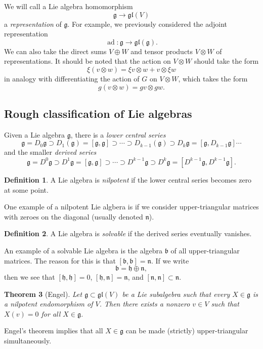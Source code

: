 \documentclass{amsart}
\newtheorem{thm}{Theorem}[section]
\theoremstyle{definition}
\newtheorem{defn}[thm]{Definition}
\theoremstyle{remark}
\theoremstyle{plain}
\theoremstyle{definition}
\theoremstyle{remark}
\newcommand{\g}{\mathfrak{g}}
\newcommand{\h}{\mathfrak{h}}
\newcommand{\n}{\mathfrak{n}}
\renewcommand{\b}{\mathfrak{b}}
\newcommand{\mf}[1]{\mathfrak{#1}}
\newcommand{\1}{\mathbf{1}}
\newcommand{\2}{\mathbf{2}}
\newcommand{\3}{\mathbf{3}}
\newcommand{\gl}{\mf{gl}}
\DeclareMathOperator{\ad}{ad}
\begin{document}
We will call a Lie algebra homomorphism
\[ \g \to \gl(V) \]
a \textit{representation} of \(\g\). For example, we previously considered the adjoint representation
\[ \ad \colon \g \to \gl(\g). \]
We can also take the direct sums \(V \oplus W\) and tensor products \(V \otimes W\) of representations.
It should be noted that the action on \(V \otimes W\) should take the form
\[ \xi (v \otimes w) = \xi v \otimes w + v \otimes \xi w \]
in analogy with differentiating the action of \(G\) on \(V \otimes W\), which takes the form
\[ g(v \otimes w) = gv \otimes gw. \]

\subsection{Rough classification of Lie algebras}%
\label{sub:Rough classification of Lie algebras}

Given a Lie algebra \(\g\), there is a \textit{lower central series}
\[ \g = D_0 \g \supset D_1(\g) = [\g,\g] \supset \cdots \supset D_{k-1}(\g) \supset D_k \g = [\g, D_{k-1} \g] \cdots \]
and the smaller \textit{derived series}
\[ \g = D^0\g \supset D^1 \g = [\g,\g] \supset \cdots \supset D^{k-1} \g \supset D^k \g = [D^{k-1}\g, D^{k-1}\g]. \]

\begin{defn}
    A Lie algebra is \textit{nilpotent} if the lower central series becomes zero at some point.
\end{defn}

One example of a nilpotent Lie algbera is if we consider upper-triangular matrices with zeroes on the diagonal (usually denoted \(\n\)).

\begin{defn}
    A Lie algebra is \textit{solvable} if the derived series eventually vanishes.
\end{defn}

An example of a solvable Lie algebra is the algebra \(\b\) of all upper-triangular matrices. The reason for this is that \([\b, \b] = \n\). If we write
\[ \b = \h \oplus \n, \]
then we see that \([\h, \h] = 0\), \([\h, \n] = \n\), and \([\n, \n] \subset \n\).

\begin{thm}[Engel]
    Let \(\g \subset \gl(V)\) be a Lie subalgebra such that every \(X \in \g\) is a nilpotent endomorphism of \(V\). Then there exists a nonzero \(v \in V\) such that \(X(v) = 0\) for all \(X \in \g\).
\end{thm}

Engel's theorem implies that all \(X \in \g\) can be made (strictly) upper-triangular simultaneously.
\end{document}
